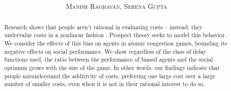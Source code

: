 \documentclass[twoside]{article}
\title{\vspace{-15mm}\fontsize{24pt}{10pt}\selectfont\textbf{\titlee}} %
\author{
\large
\textsc{Manish Raghavan, Serena Gupta}
\vspace{-5mm}
}
\begin{document}
\maketitle %

\thispagestyle{fancy} %

\begin{abstract}

  Research shows that people aren't rational in evaluating costs -- instead,
  they undervalue costs in a nonlinear fashion
  \cite{Kahneman1979}. Prospect theory seeks to model this
  behavior. We consider the effects of this bias on agents in atomic congestion
  games, bounding its negative effects on social performance. We show regardless
  of the class of delay functions used, the ratio between the performance of
  biased agents and the social optimum grows with the size of the game. In other words, our findings indicate that people misunderstand the additivity of
  costs, preferring one large cost over a large number of smaller costs, even
  when it is not in their rational interest to do so.

\end{abstract}
\end{document}
